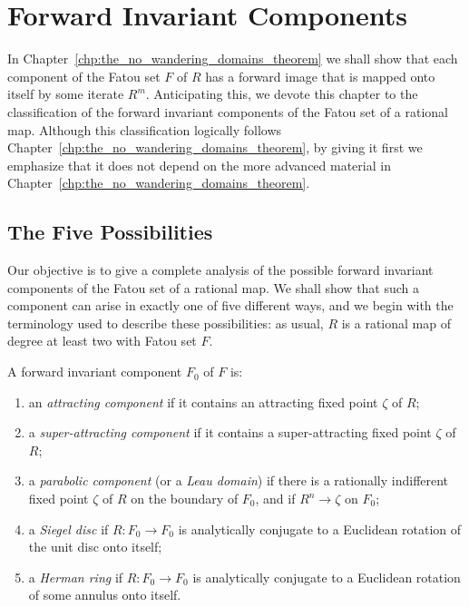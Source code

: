 \chapter{Forward Invariant Components}
\label{chp:forward_invariant_components}

In Chapter~\ref{chp:the_no_wandering_domains_theorem} we shall show that each
component of the Fatou set $F$ of $R$ has a forward image that is mapped onto
itself by some iterate $R^m$. Anticipating this, we devote this chapter to the
classification of the forward invariant components of the Fatou set of a
rational map. Although this classification logically follows
Chapter~\ref{chp:the_no_wandering_domains_theorem}, by giving it first we
emphasize that it does not depend on the more advanced material in
Chapter~\ref{chp:the_no_wandering_domains_theorem}.

\section{The Five Possibilities}
\label{sec:the_five_possibilities}

Our objective is to give a complete analysis of the possible forward invariant
components of the Fatou set of a rational map. We shall show that such a
component can arise in exactly one of five different ways, and we begin with the
terminology used to describe these possibilities: as usual, $R$ is a rational
map of degree at least two with Fatou set $F$.

\begin{definition}
    \label{def:types_of_forward_invariant_components_of_F}
    A forward invariant component $F_0$ of $F$ is:
    \begin{enumerate}[label=(\alph*)]
        \item \label{itm:attracting_component} an \emph{attracting component} if
        it contains an attracting fixed point $\zeta$ of $R$;
        \item \label{itm:superattracting_component} a \emph{super-attracting
        component} if it contains a super-attracting fixed point $\zeta$ of $R$;
        \item \label{itm:parabolic_component} a \emph{parabolic component} (or a
        \emph{Leau domain}) if there is a rationally indifferent fixed point
        $\zeta$ of $R$ on the boundary of $F_0$, and if $R^n \to \zeta$ on
        $F_0$;
        \item \label{itm:siegel_disc} a \emph{Siegel disc} if $R: F_0 \to F_0$
        is analytically conjugate to a Euclidean rotation of the unit disc onto
        itself;
        \item \label{itm:herman_ring} a \emph{Herman ring} if $R: F_0 \to F_0$
        is analytically conjugate to a Euclidean rotation of some annulus onto
        itself.
    \end{enumerate}
\end{definition}

